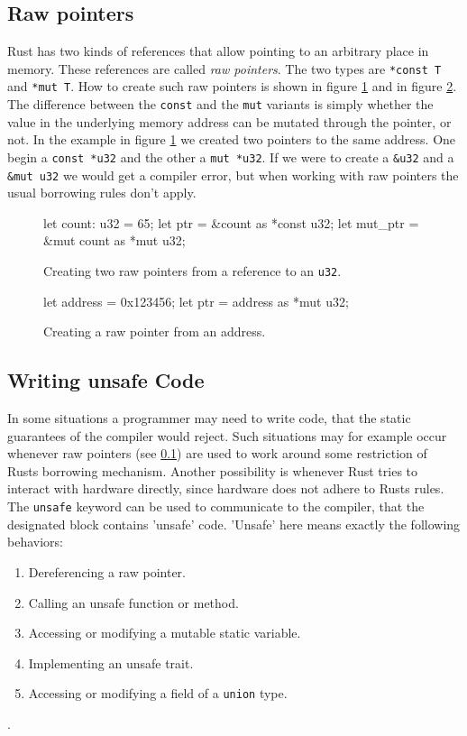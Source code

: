 \documentclass[twocolumn]{article}
\begin{document}
\subsection{Raw pointers}
\label{raw-pointer}
Rust has two kinds of references that allow pointing to an arbitrary place in memory.
These references are called \textit{raw pointers}.
The two types are \texttt{*const T} and \texttt{*mut T}.
How to create such raw pointers is shown in figure \ref{raw-pointer-new} and in figure \ref{raw-pointer-new2}.
The difference between the \texttt{const} and the \texttt{mut} variants is simply whether the value in the underlying memory address can be mutated through the pointer, or not.
In the example in figure \ref{raw-pointer-new} we created two pointers to the same address.
One begin a \texttt{const *u32} and the other a \texttt{mut *u32}.
If we were to create a \texttt{&u32} and a \texttt{&mut u32} we would get a compiler error, but when working with raw pointers the usual borrowing rules don't apply.
\begin{figure}
\begin{rustcode}
let count: u32 = 65;
let ptr = &count as *const u32;
let mut_ptr = &mut count as *mut u32;
\end{rustcode}
\vspace{-2em}
\caption{Creating two raw pointers from a reference to an \texttt{u32}.}
\label{raw-pointer-new}
\end{figure}
\begin{figure}
\begin{rustcode}
let address = 0x123456;
let ptr = address as *mut u32;
\end{rustcode}
\vspace{-2em}
\caption{Creating a raw pointer from an address.}
\label{raw-pointer-new2}
\end{figure}
\subsection{Writing unsafe Code}
\label{unsafe}
In some situations a programmer may need to write code, that the static guarantees of the compiler would reject.
Such situations may for example occur whenever raw pointers (see \ref{raw-pointer}) are used to work around some restriction of Rusts borrowing mechanism.
Another possibility is whenever Rust tries to interact with hardware directly, since hardware does not adhere to Rusts rules.
The \texttt{unsafe} keyword can be used to communicate to the compiler, that the designated block contains 'unsafe' code.
'Unsafe' here means exactly the following behaviors:
\begin{enumerate}
        \item Dereferencing a raw pointer.
        \item Calling an unsafe function or method.
        \item Accessing or modifying a mutable static variable.
        \item Implementing an unsafe trait.
        \item Accessing or modifying a field of a \texttt{union} type.
\end{enumerate}
\cite{RustBook-Unsafe}.
\end{document}
